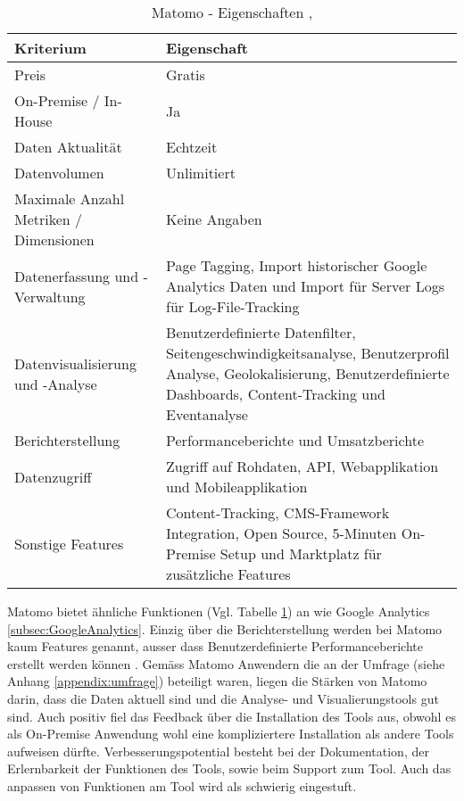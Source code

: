 \begin{table}[h]
	\centering
	\begin{tabular}{ | p{4cm} | p{10cm} |}
		\hline
		\textbf{Kriterium} & \textbf{Eigenschaft}  \\ 
		\hline
    Preis & Gratis \\
    \hline
    On-Premise / In-House & Ja \\
    \hline
    Daten Aktualität & Echtzeit \\
    \hline
		Datenvolumen & Unlimitiert \\
    \hline
    Maximale Anzahl Metriken / Dimensionen & Keine Angaben \\
    \hline
		Datenerfassung und -Verwaltung & Page Tagging, Import historischer Google Analytics Daten und Import für Server Logs für Log-File-Tracking \\
    \hline
    Datenvisualisierung und -Analyse & Benutzerdefinierte Datenfilter, Seitengeschwindigkeitsanalyse, Benutzerprofil Analyse,  Geolokalisierung, Benutzerdefinierte Dashboards, Content-Tracking und Eventanalyse \\
    \hline
    Berichterstellung & Performanceberichte und Umsatzberichte \\
    \hline
    Datenzugriff & Zugriff auf Rohdaten, API, Webapplikation und Mobileapplikation \\
    \hline
    Sonstige Features & Content-Tracking, CMS-Framework Integration, Open Source, 5-Minuten On-Premise Setup und Marktplatz für zusätzliche Features \\
		\hline  
	\end{tabular}
	\caption{Matomo - Eigenschaften \parencite{MamotoCloudVsOnPremise}, \parencite{MamotoFeatures}}
	\label{tab: MatomoFeatures}
\end{table}

Matomo bietet ähnliche Funktionen (Vgl. Tabelle \ref{tab: MatomoFeatures}) an wie Google Analytics \ref{subsec:GoogleAnalytics}. Einzig über die Berichterstellung werden bei Matomo kaum Features genannt, ausser dass Benutzerdefinierte Performanceberichte erstellt werden können \parencite{MamotoFeatures}. Gemäss Matomo Anwendern die an der Umfrage (siehe Anhang \ref{appendix:umfrage}) beteiligt waren, liegen die Stärken von Matomo darin, dass die Daten aktuell sind und die Analyse- und Visualierungstools gut sind. 
Auch positiv fiel das Feedback über die Installation des Tools aus, obwohl es als On-Premise Anwendung wohl eine kompliziertere Installation als andere Tools aufweisen dürfte.
Verbesserungspotential besteht bei der Dokumentation, der Erlernbarkeit der Funktionen des Tools, sowie beim Support zum Tool. Auch das anpassen von Funktionen am Tool wird als schwierig eingestuft.

